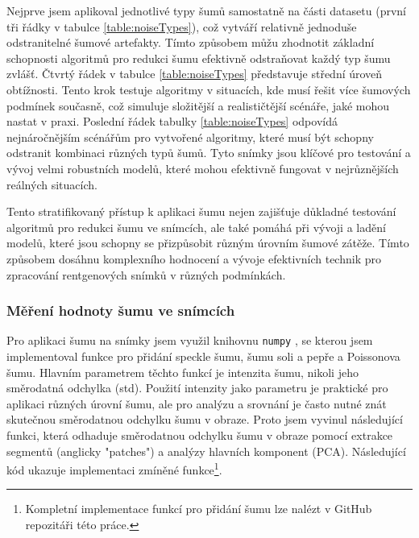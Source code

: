 \documentclass[male,czech,api_ing]{thesis}
\begin{document}
Nejprve jsem aplikoval jednotlivé typy šumů samostatně na části datasetu (první tři řádky v tabulce \ref{table:noiseTypes}), což vytváří relativně jednoduše odstranitelné šumové artefakty. Tímto způsobem můžu zhodnotit základní schopnosti algoritmů pro redukci šumu efektivně odstraňovat každý typ šumu zvlášť. Čtvrtý řádek v tabulce \ref{table:noiseTypes} představuje střední úroveň obtížnosti. Tento krok testuje algoritmy v situacích, kde musí řešit více šumových podmínek současně, což simuluje složitější a realističtější scénáře, jaké mohou nastat v praxi. Poslední řádek tabulky \ref{table:noiseTypes} odpovídá nejnáročnějším scénářům pro vytvořené algoritmy, které musí být schopny odstranit kombinaci různých typů šumů. Tyto snímky jsou klíčové pro testování a vývoj velmi robustních modelů, které mohou efektivně fungovat v nejrůznějších reálných situacích.

Tento stratifikovaný přístup k aplikaci šumu nejen zajišťuje důkladné testování algoritmů pro redukci šumu ve snímcích, ale také pomáhá při vývoji a ladění modelů, které jsou schopny se přizpůsobit různým úrovním šumové zátěže. Tímto způsobem dosáhnu komplexního hodnocení a vývoje efektivních technik pro zpracování rentgenových snímků v různých podmínkách.

\subsubsection{Měření hodnoty šumu ve snímcích}
Pro aplikaci šumu na snímky jsem využil knihovnu \texttt{numpy} \cite{Numpy}, se kterou jsem implementoval funkce pro přidání speckle šumu, šumu soli a pepře a Poissonova šumu. Hlavním parametrem těchto funkcí je intenzita šumu, nikoli jeho směrodatná odchylka (std). Použití intenzity jako parametru je praktické pro aplikaci různých úrovní šumu, ale pro analýzu a srovnání je často nutné znát skutečnou směrodatnou odchylku šumu v obraze. Proto jsem vyvinul následující funkci, která odhaduje směrodatnou odchylku šumu v obraze pomocí extrakce segmentů (anglicky "patches") a analýzy hlavních komponent (PCA). Následující kód ukazuje implementaci zmíněné funkce\footnote{Kompletní implementace funkcí pro přidání šumu lze nalézt v GitHub repozitáři této práce.}.
\end{document}
